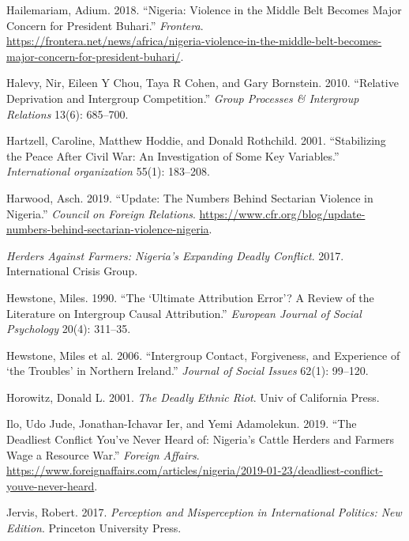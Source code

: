 \documentclass[11pt]{article}
\begin{document}
\leavevmode\hypertarget{ref-frontera2018nigeria}{}%
Hailemariam, Adium. 2018. ``Nigeria: Violence in the Middle Belt Becomes
Major Concern for President Buhari.'' \emph{Frontera}.
\url{https://frontera.net/news/africa/nigeria-violence-in-the-middle-belt-becomes-major-concern-for-president-buhari/}.

\leavevmode\hypertarget{ref-halevy2010relative}{}%
Halevy, Nir, Eileen Y Chou, Taya R Cohen, and Gary Bornstein. 2010.
``Relative Deprivation and Intergroup Competition.'' \emph{Group
Processes \& Intergroup Relations} 13(6): 685--700.

\leavevmode\hypertarget{ref-hartzell2001stabilizing}{}%
Hartzell, Caroline, Matthew Hoddie, and Donald Rothchild. 2001.
``Stabilizing the Peace After Civil War: An Investigation of Some Key
Variables.'' \emph{International organization} 55(1): 183--208.

\leavevmode\hypertarget{ref-council2019nigeria}{}%
Harwood, Asch. 2019. ``Update: The Numbers Behind Sectarian Violence in
Nigeria.'' \emph{Council on Foreign Relations}.
\url{https://www.cfr.org/blog/update-numbers-behind-sectarian-violence-nigeria}.

\leavevmode\hypertarget{ref-icg2017nigeria}{}%
\emph{Herders Against Farmers: Nigeria's Expanding Deadly Conflict}.
2017. International Crisis Group.

\leavevmode\hypertarget{ref-hewstone1990ultimate}{}%
Hewstone, Miles. 1990. ``The `Ultimate Attribution Error'? A Review of
the Literature on Intergroup Causal Attribution.'' \emph{European
Journal of Social Psychology} 20(4): 311--35.

\leavevmode\hypertarget{ref-hewstone2006intergroup}{}%
Hewstone, Miles et al. 2006. ``Intergroup Contact, Forgiveness, and
Experience of `the Troubles' in Northern Ireland.'' \emph{Journal of
Social Issues} 62(1): 99--120.

\leavevmode\hypertarget{ref-horowitz2001deadly}{}%
Horowitz, Donald L. 2001. \emph{The Deadly Ethnic Riot}. Univ of
California Press.

\leavevmode\hypertarget{ref-fa2019deadly}{}%
Ilo, Udo Jude, Jonathan-Ichavar Ier, and Yemi Adamolekun. 2019. ``The
Deadliest Conflict You've Never Heard of: Nigeria's Cattle Herders and
Farmers Wage a Resource War.'' \emph{Foreign Affairs}.
\url{https://www.foreignaffairs.com/articles/nigeria/2019-01-23/deadliest-conflict-youve-never-heard}.

\leavevmode\hypertarget{ref-jervis2017perception}{}%
Jervis, Robert. 2017. \emph{Perception and Misperception in
International Politics: New Edition}. Princeton University Press.
\end{document}
